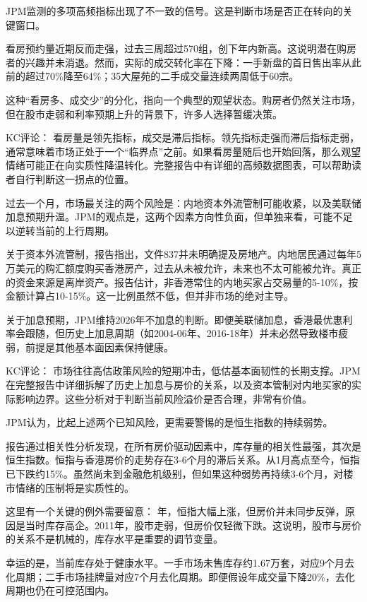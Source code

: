 \documentclass[11pt]{ctexart}
\begin{document}
JPM监测的多项高频指标出现了不一致的信号。这是判断市场是否正在转向的关键窗口。

看房预约量近期反而走强，过去三周超过570组，创下年内新高。这说明潜在购房者的兴趣并未消退。然而，实际的成交转化率在下降：一手新盘的首日售出率从此前的超过70\%降至64\%；35大屋苑的二手成交量连续两周低于60宗。

这种“看房多、成交少”的分化，指向一个典型的观望状态。购房者仍然关注市场，但在股市走弱和利率预期上升的背景下，许多人选择暂缓决策。

KC评论： 看房量是领先指标，成交是滞后指标。领先指标走强而滞后指标走弱，通常意味着市场正处于一个“临界点”之前。如果看房量随后也开始回落，那么观望情绪可能正在向实质性降温转化。完整报告中有详细的高频数据图表，可以帮助读者自行判断这一拐点的位置。

过去一个月，市场最关注的两个风险是：内地资本外流管制可能收紧，以及美联储加息预期升温。JPM的观点是，这两个因素方向性负面，但单独来看，可能不足以逆转当前的上行周期。

关于资本外流管制，报告指出，文件837并未明确提及房地产。内地居民通过每年5万美元的购汇额度购买香港房产，过去从未被允许，未来也不太可能被允许。真正的资金来源是离岸资产。报告估计，非香港常住的内地买家占交易量的5-10\%，按金额计算占10-15\%。这一比例虽然不低，但并非市场的绝对主导。

关于加息预期，JPM维持2026年不加息的判断。即便美联储加息，香港最优惠利率会跟随，但历史上加息周期（如2004-06年、2016-18年）并未必然导致楼市疲弱，前提是其他基本面因素保持健康。

KC评论： 市场往往高估政策风险的短期冲击，低估基本面韧性的长期支撑。JPM在完整报告中详细拆解了历史上加息与房价的关系，以及资本管制对内地买家的实际影响边界。这些分析对于判断当前风险溢价是否合理，非常有价值。

JPM认为，比起上述两个已知风险，更需要警惕的是恒生指数的持续弱势。

报告通过相关性分析发现，在所有房价驱动因素中，库存量的相关性最强，其次是恒生指数。恒指与香港房价的走势存在3-6个月的滞后关系。从1月高点至今，恒指已下跌约15\%。虽然尚未到金融危机级别，但如果这种弱势再持续3-6个月，对楼市情绪的压制将是实质性的。

这里有一个关键的例外需要留意： 年，恒指大幅上涨，但房价并未同步反弹，原因是当时库存高企。2011年，股市走弱，但房价仅轻微下跌。这说明，股市与房价的关系不是机械的，库存水平是重要的调节变量。

幸运的是，当前库存处于健康水平。一手市场未售库存约1.67万套，对应9个月去化周期；二手市场挂牌量对应7个月去化周期。即便假设年成交量下降20\%，去化周期也仍在可控范围内。
\end{document}
